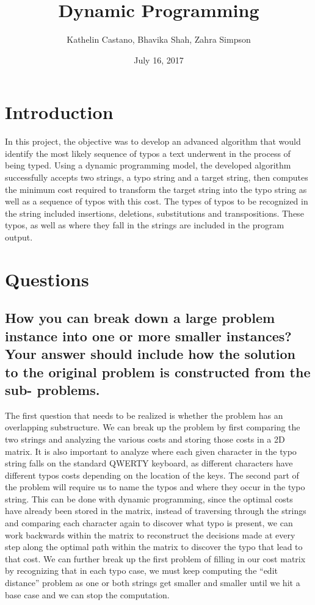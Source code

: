 \documentclass[letterpaper,12pt]{article}
\begin{document}
\title{\Huge\textbf{Dynamic Programming} }
\author{Kathelin Castano, Bhavika Shah, Zahra Simpson}
\date{July 16, 2017}
\maketitle
\clearpage


\section{Introduction}

In this project, the objective was to develop an advanced algorithm that would identify the most likely sequence of typos a text underwent in the process of being typed. Using a dynamic programming model, the developed algorithm successfully accepts two strings, a typo string and a target string, then computes the minimum cost required to transform the target string into the typo string as well as a sequence of typos with this cost. The types of typos to be recognized in the string included insertions, deletions, substitutions and transpositions. These typos, as well as where they fall in the strings are included in the program output. 

\section{Questions}
\subsection{How you can break down a large problem instance into one or more smaller instances? Your answer should include how the solution to the original problem is constructed from the sub- problems.}
The first question that needs to be realized is whether the problem has an overlapping substructure. We can break up the problem by first comparing the two strings and analyzing the various costs and storing those costs in a 2D matrix. It is also important to analyze where each given character in the typo string falls on the standard QWERTY keyboard, as different characters have different typos costs depending on the location of the keys. The second part of the problem will require us to name the typos and where they occur in the typo string. This can be done with dynamic programming, since the optimal costs have already been stored in the matrix, instead of traversing through the strings and comparing each character again to discover what typo is present, we can work backwards within the matrix to reconstruct the decisions made at every step along the optimal path within the matrix to discover the typo that lead to that cost. We can further break up the first problem of filling in our cost matrix by recognizing that in each typo case, we must keep computing the “edit distance” problem as one or both strings get smaller and smaller until we hit a base case and we can stop the computation. 
\end{document}
